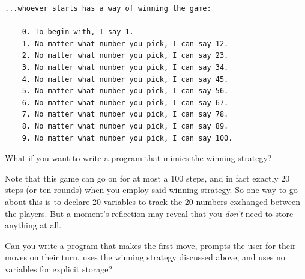 \documentclass[
  letterpaper,
  DIV=11,
  numbers=noendperiod]{scrreprt}
\begin{document}
\begin{tcolorbox}[standard jigsaw,toptitle=1mm, titlerule=0mm, bottomtitle=1mm, title=\textcolor{quarto-callout-note-color}{\faInfo}\hspace{0.5em}{Recall from class and/or figure out that\ldots{}}, coltitle=black, colback=white, toprule=.15mm, colframe=quarto-callout-note-color-frame, arc=.35mm, rightrule=.15mm, opacityback=0, left=2mm, leftrule=.75mm, colbacktitle=quarto-callout-note-color!10!white, opacitybacktitle=0.6, bottomrule=.15mm]

\begin{tcolorbox}[standard jigsaw,toptitle=1mm, titlerule=0mm, bottomtitle=1mm, title=\textcolor{quarto-callout-warning-color}{\faExclamationTriangle}\hspace{0.5em}{SPOILER ALERT}, coltitle=black, colback=white, toprule=.15mm, colframe=quarto-callout-warning-color-frame, arc=.35mm, rightrule=.15mm, opacityback=0, left=2mm, leftrule=.75mm, colbacktitle=quarto-callout-warning-color!10!white, opacitybacktitle=0.6, bottomrule=.15mm]

\begin{verbatim}
...whoever starts has a way of winning the game:

    0. To begin with, I say 1. 
    1. No matter what number you pick, I can say 12.
    2. No matter what number you pick, I can say 23.
    3. No matter what number you pick, I can say 34.
    4. No matter what number you pick, I can say 45.
    5. No matter what number you pick, I can say 56.
    6. No matter what number you pick, I can say 67.
    7. No matter what number you pick, I can say 78.
    8. No matter what number you pick, I can say 89.
    9. No matter what number you pick, I can say 100.
\end{verbatim}

\end{tcolorbox}

\end{tcolorbox}

What if you want to write a program that mimics the winning strategy?

Note that this game can go on for at most a 100 steps, and in fact
exactly 20 steps (or ten rounds) when you employ said winning strategy.
So one way to go about this is to declare 20 variables to track the 20
numbers exchanged between the players. But a moment's reflection may
reveal that you \emph{don't} need to store anything at all.

\begin{tcolorbox}[standard jigsaw,toptitle=1mm, titlerule=0mm, bottomtitle=1mm, title=\textcolor{quarto-callout-caution-color}{\faFire}\hspace{0.5em}{Exercise}, coltitle=black, colback=white, toprule=.15mm, colframe=quarto-callout-caution-color-frame, arc=.35mm, rightrule=.15mm, opacityback=0, left=2mm, leftrule=.75mm, colbacktitle=quarto-callout-caution-color!10!white, opacitybacktitle=0.6, bottomrule=.15mm]
Can you write a program that makes the first move, prompts the user for
their moves on their turn, uses the winning strategy discussed above,
and uses no variables for explicit storage?
\end{tcolorbox}
\end{document}
